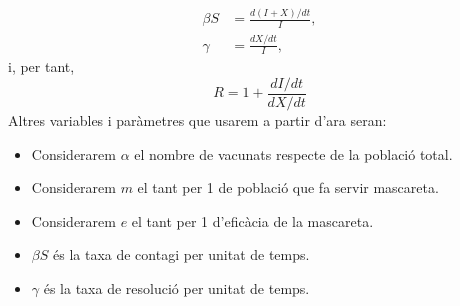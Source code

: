 \documentclass[a4paper, 11pt]{article}
\begin{document}
  \begin{align}
    \beta S &= \frac{d(I + X)/dt}{I},\\
    \gamma &= \frac{dX/dt}{I},
  \end{align}
  i, per tant,
  \begin{equation}
    R = 1 + \frac{dI/dt}{dX/dt}
  \end{equation}
  Altres variables i paràmetres que usarem a partir d'ara seran:
  \begin{itemize}
    \item Considerarem $\alpha$ el nombre de vacunats respecte de la població total.
    \item Considerarem $m$ el tant per 1 de població que fa servir mascareta.
    \item Considerarem $e$ el tant per 1 d'eficàcia de la mascareta.
    \item $\beta S$ és la taxa de contagi per unitat de temps.
    \item $\gamma$ és la taxa de resolució per unitat de temps.
  \end{itemize}
\end{document}
